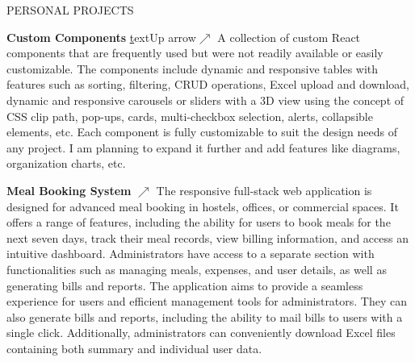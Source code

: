 \documentclass{resume} %
\begin{document}

\begin{rSection}{PERSONAL PROJECTS}
\vspace{-1.25em}






\item \textbf{Custom Components}
\href{https://custom-components-orpin.vercel.app/}text{Up arrow}{\texorpdfstring{\(\nearrow\)}{nearrow}}
{A collection of custom React components that are frequently used but were not readily available or easily customizable. The components include dynamic and responsive tables with features such as sorting, filtering, CRUD operations, Excel upload and download, dynamic and responsive carousels or sliders with a 3D view using the concept of CSS clip path, pop-ups, cards, multi-checkbox selection, alerts, collapsible elements, etc. Each component is fully customizable to suit the design needs of any project. I am planning to expand it further and add features like diagrams, organization charts, etc.}



\item \textbf{Meal Booking System}
\href{https://meal-booking-system.vercel.app/}{\texorpdfstring{\(\nearrow\)}{nearrow}}
{
The responsive full-stack web application is designed for advanced meal booking in hostels, offices, or commercial spaces. It offers a range of features, including the ability for users to book meals for the next seven days, track their meal records, view billing information, and access an intuitive dashboard. Administrators have access to a separate section with functionalities such as managing meals, expenses, and user details, as well as generating bills and reports. The application aims to provide a seamless experience for users and efficient management tools for administrators. They can also generate bills and reports, including the ability to mail bills to users with a single click. Additionally, administrators can conveniently download Excel files containing both summary and individual user data.}






\end{rSection}
\end{document}
